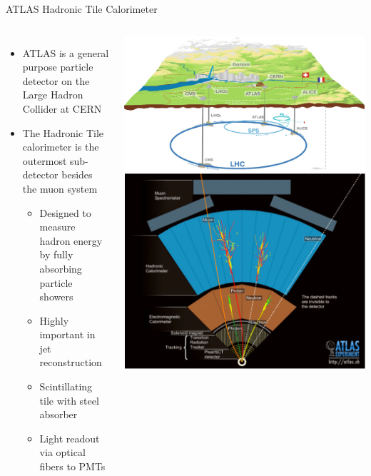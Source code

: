 \documentclass[aspectratio=169,xcolor=table]{beamer}
\begin{document}
  \begin{frame}[t]{ATLAS Hadronic Tile Calorimeter}
    \begin{columns}
        \begin{itemize}
          \item ATLAS is a general purpose particle detector on the Large Hadron Collider at CERN
          \item The Hadronic Tile calorimeter is the outermost sub-detector besides the muon system
          \begin{itemize}
            \item Designed to measure hadron energy by fully absorbing particle showers
            \item Highly important in jet reconstruction
            \item Scintillating tile with steel absorber
            \item Light readout via optical fibers to PMTs
          \end{itemize}
        \end{itemize}
        \centering
        \includegraphics[height=.15\textheight,keepaspectratio=true]{LHC.png}
        \includegraphics[height=.25\textheight,keepaspectratio=true]{ATLASCrossSectionDiagram.png}


\end{columns}
\end{frame}
\end{document}
